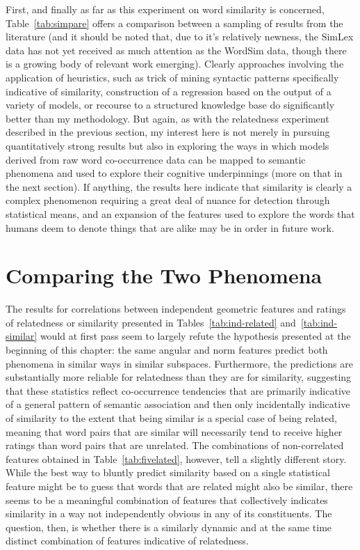 First, and finally as far as this experiment on word similarity is concerned, Table~\ref{tab:simpare} offers a comparison between a sampling of results from the literature (and it should be noted that, due to it's relatively newness, the SimLex data has not yet received as much attention as the WordSim data, though there is a growing body of relevant work emerging).  Clearly approaches involving the application of heuristics, such as  trick of mining syntactic patterns specifically indicative of similarity,  construction of a regression based on the output of a variety of models, or  recourse to a structured knowledge base do significantly better than my methodology.  But again, as with the relatedness experiment described in the previous section, my interest here is not merely in pursuing quantitatively strong results but also in exploring the ways in which models derived from raw word co-occurrence data can be mapped to semantic phenomena and used to explore their cognitive underpinnings (more on that in the next section).  If anything, the results here indicate that similarity is clearly a complex phenomenon requiring a great deal of nuance for detection through statistical means, and an expansion of the features used to explore the words that humans deem to denote things that are alike may be in order in future work.

\section{Comparing the Two Phenomena} \label{sec:litpare}
The results for correlations between independent geometric features and ratings of relatedness or similarity presented in Tables~\ref{tab:ind-related} and~\ref{tab:ind-similar} would at first pass seem to largely refute the hypothesis presented at the beginning of this chapter: the same angular and norm features predict both phenomena in similar ways in similar subspaces.  Furthermore, the predictions are substantially more reliable for relatedness than they are for similarity, suggesting that these statistics reflect co-occurrence tendencies that are primarily indicative of a general pattern of semantic association and then only incidentally indicative of similarity to the extent that being similar is a special case of being related, meaning that word pairs that are similar will necessarily tend to receive higher ratings than word pairs that are unrelated.  The combinations of non-correlated features obtained in Table~\ref{tab:fivelated}, however, tell a slightly different story.  While the best way to bluntly predict similarity based on a single statistical feature might be to guess that words that are related might also be similar, there seems to be a meaningful combination of features that collectively indicates similarity in a way not independently obvious in any of its constituents.  The question, then, is whether there is a similarly dynamic and at the same time distinct combination of features indicative of relatedness.

